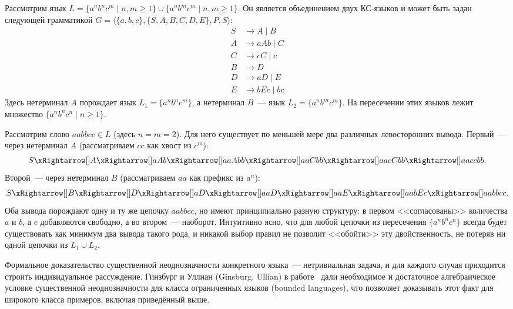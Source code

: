 \begin{example}
    Рассмотрим язык $L = \{a^n b^n c^m \mid n, m \ge 1\} \cup \{a^n b^m c^m \mid n, m \ge 1\}$.
    Он является объединением двух КС-языков и может быть задан следующей грамматикой $G = \langle \{a, b, c\}, \{S, A, B, C, D, E\}, P, S \rangle$:
    \begin{align*}
        S & \to A \mid B  \\
        A & \to a A b \mid C \\
        C & \to c C \mid c  \\
        B & \to D          \\
        D & \to a D \mid E \\
        E & \to b E c \mid b c
    \end{align*}
    Здесь нетерминал $A$ порождает язык $L_1 = \{a^n b^n c^m\}$, а нетерминал $B$~--- язык $L_2 = \{a^n b^m c^m\}$.
    На пересечении этих языков лежит множество $\{a^n b^n c^n \mid n \ge 1\}$.

    Рассмотрим слово $aabbcc \in L$ (здесь $n = m = 2$).
    Для него существует по меньшей мере два различных левосторонних вывода.
    Первый~--- через нетерминал $A$ (рассматриваем $cc$ как хвост из $c^m$):
    \begin{multline*}
        S \derives[] A \derives[] a A b \derives[] a a A b b \derives[] a a C b b \derives[] a a c C b b \derives[] a a c c b b.
    \end{multline*}
    Второй~--- через нетерминал $B$ (рассматриваем $aa$ как префикс из $a^n$):
    \begin{multline*}
        S \derives[] B \derives[] D \derives[] a D \derives[] a a D \derives[] a a E \derives[] a a b E c \derives[] a a b b c c.
    \end{multline*}
    Оба вывода порождают одну и ту же цепочку $aabbcc$, но имеют принципиально разную структуру: в первом <<согласованы>> количества $a$ и $b$, а $c$ добавляются свободно, а во втором~--- наоборот.
    Интуитивно ясно, что для любой цепочки из пересечения $\{a^n b^n c^n\}$ всегда будет существовать как минимум два вывода такого рода, и никакой выбор правил не позволит <<обойти>> эту двойственность, не потеряв ни одной цепочки из $L_1 \cup L_2$.

    Формальное доказательство существенной неоднозначности конкретного языка~--- нетривиальная задача, и для каждого случая приходится строить индивидуальное рассуждение.
    Гинзбург и Уллиан (Ginsburg, Ullian) в работе~ дали необходимое и достаточное алгебраическое условие существенной неоднозначности для класса ограниченных языков (bounded languages), что позволяет доказывать этот факт для широкого класса примеров, включая приведённый выше.
\end{example}
